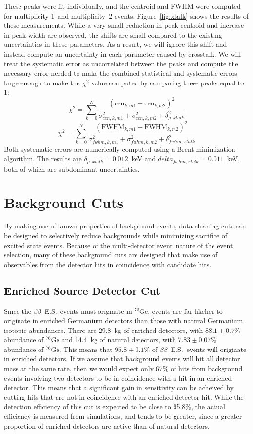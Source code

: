 \documentclass[notitlepage,rmp,aps,10pt]{revtex4-1}
\newcommand{\bb}{${\beta \beta}$}
\newcommand{\bbes}{\bb~E.S.}
\newcommand{\iso}[2]{$^{#1}$#2}
\newcommand{\Ge}[1]{\iso{#1}{Ge}}
\newcommand{\md}{multi-detector event}
\begin{document}
These peaks were fit individually, and the centroid and FWHM were computed for multiplicity 1~and multiplicity~2 events.
Figure~\ref{fig:xtalk} shows the results of these measurements.
While a very small reduction in peak centroid and increase in peak width are observed, the shifts are small compared to the existing uncertainties in these parameters.
As a result, we will ignore this shift and instead compute an uncertainty in each parameter caused by crosstalk.
We will treat the systematic error as uncorrelated between the peaks and compute the necessary error needed to make the combined statistical and systematic errors large enough to make the $\chi^2$ value computed by comparing these peaks equal to 1:
\begin{equation}
  \chi^2 = \displaystyle\sum_{k=0}^N \frac{(\mathrm{cen}_{k,m1} - \mathrm{cen}_{k,m2})^2}{\sigma_{cen,k,m1}^2+\sigma_{cen,k,m2}^2+\delta_{\mu,xtalk}^2}
\end{equation}
\begin{equation}
  \chi^2 = \displaystyle\sum_{k=0}^N \frac{(\mathrm{FWHM}_{k,m1} - \mathrm{FWHM}_{k,m2})^2}{\sigma_{fwhm,k,m1}^2+\sigma_{fwhm,k,m2}^2+\delta_{fwhm,xtalk}^2}
\end{equation}
Both systematic errors are numerically computed using a Brent minimization algorithm.
The results are $\delta_{\mu,xtalk}=0.012$~keV and $delta_{fwhm,xtalk}=0.011$~keV, both of which are subdominant uncertainties.


\section{Background Cuts}
By making use of known properties of background events, data cleaning cuts can be designed to selectively reduce backgrounds while minimizing sacrifice of excited state events.
Because of the \md\ nature of the event selection, many of these background cuts are designed that make use of observables from the detector hits in coincidence with candidate hits.

\subsection{Enriched Source Detector Cut}
Since the \bbes\ events must originate in \Ge{76}, events are far likelier to originate in enriched Germanium detectors than those with natural Germanium isotopic abundances.
There are 29.8~kg of enriched detectors, with $88.1 \pm 0.7$\% abundance of \Ge{76} and 14.4~kg of natural detectors, with $7.83 \pm 0.07$\% abundance of \Ge{76}.
This means that $95.8 \pm 0.1$\% of \bbes\ events will originate in enriched detectors.
If we assume that background events will hit all detector mass at the same rate, then we would expect only 67\% of hits from background events involving two detectors to be in coincidence with a hit in an enriched detector.
This means that a significant gain in sensitivity can be acheived by cutting hits that are not in coincidence with an enriched detector hit.
While the detection efficiency of this cut is expected to be close to 95.8\%, the actual efficiency is measured from simulations, and tends to be greater, since a greater proportion of enriched detectors are active than of natural detectors.
\end{document}
